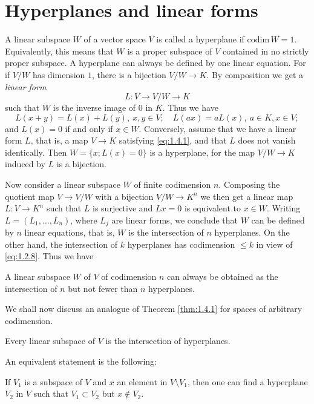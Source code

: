 \section{Hyperplanes and linear forms}\label{sec:1.4}
A linear subspace $W$ of a vector space $V$ is called a hyperplane if
$\mathrm{codim}\,W=1$. Equivalently, this means that $W$ is a proper
subspace of $V$ contained in no strictly proper subspace. A hyperplane
can always be defined by one linear equation. For if $V/W$ has
dimension $1$, there is a bijection $V/W\to K$. By composition we get
a \emph{linear form}
\begin{displaymath}
  L:V\to V/W\to K
\end{displaymath}
such that $W$ is the inverse image of $0$ in $K$. Thus we have
\begin{equation}
  \label{eq:1.4.1}
  L(x+y)=L(x)+L(y),\ x,y\in V;\quad L(ax)=aL(x),\ a\in K,x\in
  V;
\end{equation}
and $L(x)=0$ if and only if $x\in W$. Conversely, assume that we have
a linear form $L$, that is, a map $V\to K$ satisfying
\eqref{eq:1.4.1}, and that $L$ does not vanish identically. Then
$W=\{x;L(x)=0\}$ is a hyperplane, for the map $V/W\to K$ induced by
$L$ is a bijection.\par
Now consider a linear subspace $W$ of finite codimension
$n$. Composing the quotient map $V\to V/W$ with a bijection $V/W\to
K^n$ we then get a linear map $L:V\to K^n$ such that $L$ is surjective
and $Lx=0$ is equivalent to $x\in W$. Writing $L=(L_1,\dots,L_n)$,
where $L_j$ are linear forms, we conclude that $W$ can be defined by
$n$ linear equations, that is, $W$ is the intersection of $n$
hyperplanes. On the other hand, the intersection of $k$ hyperplanes
has codimension $\leq k$ in view of \eqref{eq:1.2.8}. Thus we have
\begin{thm}
  \label{thm:1.4.1}
  A linear subspace $W$ of $V$ of codimension $n$ can always be
  obtained as the intersection of $n$ but not fewer than $n$ hyperplanes.
\end{thm}
We shall now discuss an analogue of Theorem \ref{thm:1.4.1} for spaces
of arbitrary codimension.
\begin{thm}
  \label{thm:1.4.2}
  Every linear subspace of $V$ is the intersection of hyperplanes.
\end{thm}
An equivalent statement is the following:
\addtocounter{dfn}{-1}
\renewcommand{\thedfn}{\arabic{chapter}.\arabic{section}.\arabic{dfn}$'$}
\begin{thm}
  \label{thm:1.4.3}
  If $V_1$ is a subspace of $V$ and $x$ an element in $V\setminus V_1$, then
  one can find a hyperplane $V_2$ in $V$ such that $V_1\subset V_2$
  but $x\notin V_2$.
\end{thm}

